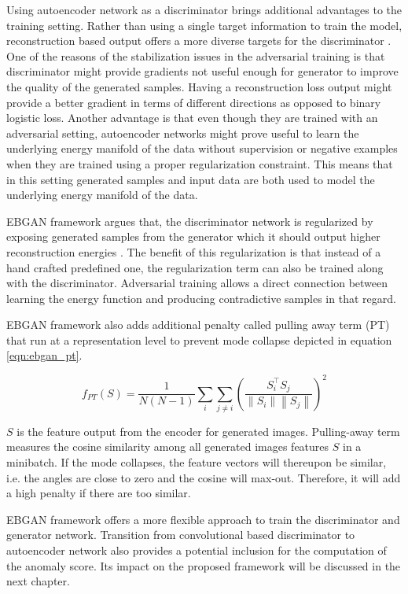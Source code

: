 Using autoencoder network as a discriminator brings additional advantages to the training setting.
Rather than using a single target information to train the model, reconstruction based output offers
a more diverse targets for the discriminator \cite{Zhao2016EnergybasedGA}. One of the reasons of the
stabilization issues in the adversarial training is that discriminator might provide gradients not
useful enough for generator to improve the quality of the generated samples. Having a reconstruction
loss output might provide a better gradient in terms of different directions as opposed to binary
logistic loss. Another advantage is that even though they are trained with an adversarial setting,
autoencoder networks might prove useful to learn the underlying energy manifold of the data without
supervision or negative examples when they are trained using a proper regularization constraint.
This means that in this setting generated samples and input data are both used to model the
underlying energy manifold of the data. 

EBGAN framework argues that, the discriminator network is regularized by exposing generated samples
from the generator  which it should output higher reconstruction energies
\cite{Zhao2016EnergybasedGA}. The benefit of this regularization is that instead of a hand crafted
predefined one, the regularization term can also be trained along with the discriminator.
Adversarial training allows a direct connection between learning the energy function and producing
contradictive samples in that regard. 

EBGAN framework also adds additional penalty called pulling away term (PT) that run at a
representation level to prevent mode collapse depicted in equation \ref{eqn:ebgan_pt}.

\begin{equation}
\label{eqn:ebgan_pt}
	f_{P T}(S)=\frac{1}{N(N-1)} \sum_{i} \sum_{j \neq i}\left(\frac{S_{i}^{\top} S_{j}}{\left\|S_{i}\right\|\left\|S_{j}\right\|}\right)^{2}
\end{equation}

 $S$ is the feature output from the encoder for generated images. Pulling-away term measures the
 cosine similarity among all generated images features $S$ in a minibatch. If the mode collapses,
 the feature vectors will thereupon be similar, i.e. the angles are close to zero and the cosine
 will max-out. Therefore, it will add a high penalty if there are too similar.
 \cite{Zhao2016EnergybasedGA}
 
 EBGAN framework offers a more flexible approach to train the discriminator and generator network. 
 Transition from convolutional based discriminator to autoencoder network also provides a potential inclusion 
 for the computation of the anomaly score. Its impact on the proposed framework will be discussed in the next chapter. 

\endgroup

